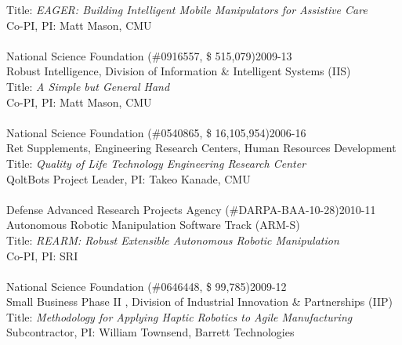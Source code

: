 Title: \textit{ EAGER: Building Intelligent Mobile Manipulators for Assistive Care
}\\
Co-PI, PI: Matt Mason, CMU\\
\\
National Science Foundation (\#0916557, \$ 515,079)\hfill 2009-13\\
Robust Intelligence, Division of Information \& Intelligent Systems (IIS)\\
Title: \textit{A Simple but General Hand}\\
Co-PI, PI: Matt Mason, CMU\\
\\
National Science Foundation (\#0540865, \$ 16,105,954)\hfill 2006-16\\
Ret Supplements, Engineering Research Centers, Human Resources Development\\
Title: \textit{Quality of Life Technology Engineering Research Center}\\
QoltBots Project Leader, PI: Takeo Kanade, CMU\\
\\
Defense Advanced Research Projects Agency (\#DARPA-BAA-10-28)\hfill 2010-11\\
Autonomous Robotic Manipulation Software Track (ARM-S)\\
Title: \textit{REARM: Robust Extensible Autonomous Robotic Manipulation}\\
Co-PI, PI: SRI\\
\\
National Science Foundation (\#0646448, \$ 99,785)\hfill 2009-12\\
Small Business Phase II , Division of Industrial Innovation \& Partnerships (IIP)\\
Title: \textit{Methodology for Applying Haptic Robotics to Agile Manufacturing}\\
Subcontractor, PI: William Townsend, Barrett Technologies\\
